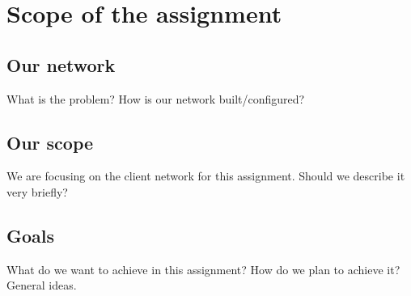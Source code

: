 \section{Scope of the assignment}
\subsection{Our network}
What is the problem? How is our network built/configured?
\subsection{Our scope}
We are focusing on the client network for this assignment. Should we describe it very briefly?
\subsection{Goals}
What do we want to achieve in this assignment? How do we plan to achieve it?
General ideas.
